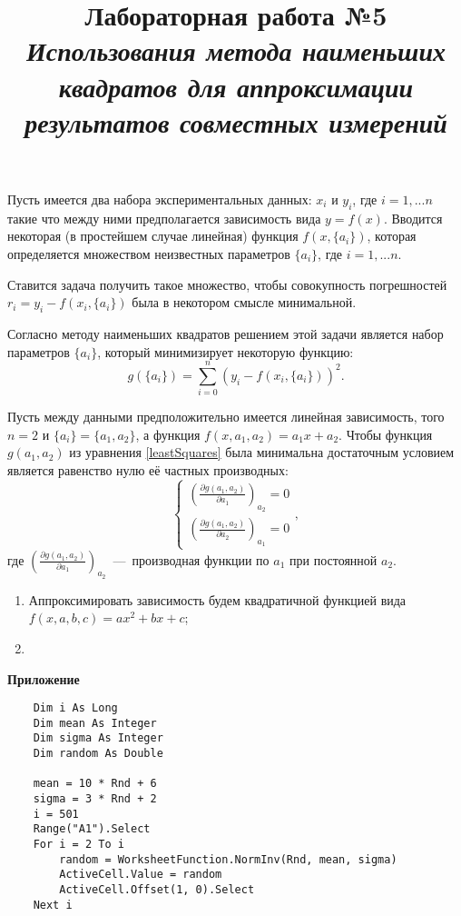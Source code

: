 \documentclass[14pt,a4paper]{article}
\title{Лабораторная работа №5 \\ \textit{Использования метода наименьших квадратов для аппроксимации результатов совместных измерений}}
\begin{document}
\maketitle
Пусть имеется два набора экспериментальных данных: $x_{i}$ и $y_{i}$, где ${i=1,...n}$ такие что между ними предполагается зависимость вида $y = f(x)$. 
Вводится некоторая (в простейшем случае линейная) функция $f(x, \{a_i\})$, которая определяется множеством неизвестных параметров $\{a_i\}$, где $i={1,...n}$.

Ставится задача получить такое множество, чтобы совокупность погрешностей $r_i=y_i-f(x_i, \{a_i\})$ была в некотором смысле минимальной.

Согласно методу наименьших квадратов решением этой задачи является набор параметров $\{a_i\}$, который минимизирует некоторую функцию:
\begin{equation} \label{leastSquares}
    g(\{a_i\}) = \sum\limits^n_{i=0} (y_i-f(x_i, \{a_i\}))^2.
\end{equation}

Пусть между данными предположительно имеется линейная зависимость, того $n=2$ и $\{a_i\} = \{a_1,a_2\}$, а функция $f(x, a_1, a_2) = a_1x + a_2$. Чтобы функция $g(a_1,a_2)$ из уравнения \ref{leastSquares} была минимальна достаточным условием является равенство нулю её частных производных:
\begin{equation}
    \begin{cases}
        \left (\frac{\partial g(a_1,a_2)}{\partial a_1} \right )_{a_2} = 0 \\
        \left (\frac{\partial g(a_1,a_2)}{\partial a_2} \right )_{a_1} = 0
    \end{cases},
\end{equation}
где $\left (\frac{\partial g(a_1,a_2)}{\partial a_1} \right )_{a_2}$~---~производная функции по $a_1$ при постоянной $a_2$.

\progress{}
\begin{enumerate}
    \item Аппроксимировать зависимость будем квадратичной функцией вида $f(x,a,b,c) = ax^2 + bx + c$;
    \item 
\end{enumerate}

\begin{center}
	\textbf{\Large Приложение}
\end{center}
	\renewcommand{\lstlistingname}{Листинг}
\begin{lstlisting}
	Dim i As Long
	Dim mean As Integer
	Dim sigma As Integer
	Dim random As Double

	mean = 10 * Rnd + 6
	sigma = 3 * Rnd + 2
	i = 501
	Range("A1").Select
	For i = 2 To i
		random = WorksheetFunction.NormInv(Rnd, mean, sigma)
		ActiveCell.Value = random
		ActiveCell.Offset(1, 0).Select
	Next i
	\end{lstlisting}
\end{document}
